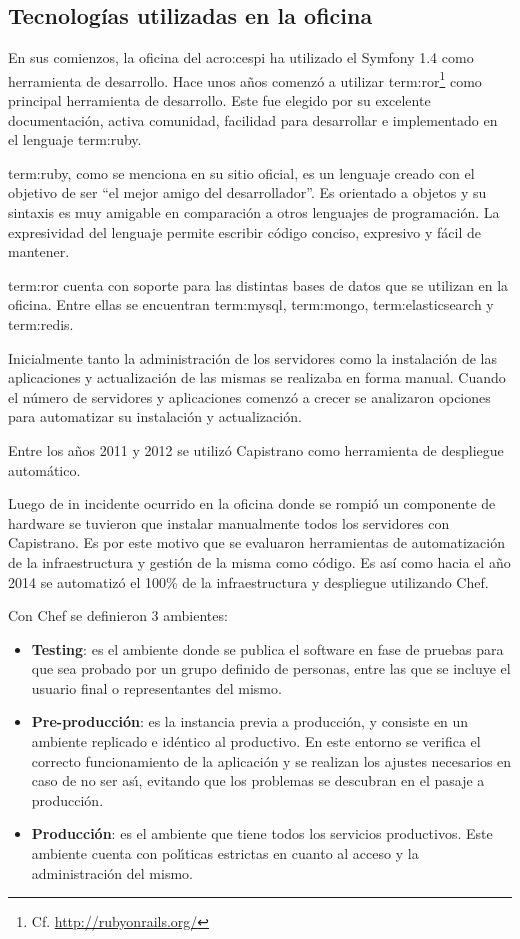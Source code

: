 \subsection{Tecnologías utilizadas en la oficina}
\label{tecnologias_utilizadas}

En sus comienzos, la oficina del \gls{acro:cespi} ha utilizado el
  Symfony 1.4 como herramienta de desarrollo. Hace unos
años comenzó a utilizar \gls{term:ror}\footnote{Cf.
\url{http://rubyonrails.org/}} como principal herramienta de desarrollo. Este
 fue elegido por su excelente documentación, activa comunidad,
facilidad para desarrollar e implementado en el lenguaje \gls{term:ruby}.

\gls{term:ruby}, como se menciona en su sitio oficial, es un lenguaje creado
con el objetivo de ser “el mejor amigo del desarrollador”. Es orientado a
objetos y su sintaxis es muy amigable en comparación a otros lenguajes de
programación. La expresividad del lenguaje permite escribir código conciso,
expresivo y fácil de mantener.

\gls{term:ror} cuenta con soporte para las distintas bases de datos que se
utilizan en la oficina. Entre ellas se encuentran \gls{term:mysql},
\gls{term:mongo}, \gls{term:elasticsearch} y \gls{term:redis}.

Inicialmente tanto la administración de los servidores como la instalación de
las aplicaciones y actualización de las mismas se realizaba en forma manual.
Cuando el número de servidores y aplicaciones comenzó a crecer se analizaron
opciones para automatizar su instalación y actualización.

Entre los años 2011 y 2012 se utilizó Capistrano como herramienta de despliegue
automático.

Luego de in incidente ocurrido en la oficina donde se rompió un componente de
hardware se tuvieron que instalar manualmente todos los servidores con
Capistrano.  Es por este motivo que se evaluaron herramientas de automatización
de la infraestructura y gestión de la misma como código. Es así como hacia el
año 2014 se automatizó el 100\% de la infraestructura y despliegue utilizando
Chef.

Con Chef se definieron 3 ambientes:

\begin{itemize}
  \item \textbf{Testing}: es el ambiente donde se publica el software en fase
    de pruebas para que sea probado por un grupo definido de personas, entre
    las que se incluye el usuario final o representantes del mismo.
  \item \textbf{Pre-producción}: es la instancia previa a producción, y
    consiste en un ambiente replicado e idéntico al productivo. En este entorno
    se verifica el correcto funcionamiento de la aplicación y se realizan los
    ajustes necesarios en caso de no ser ası́, evitando que los problemas se
    descubran en el pasaje a producción.
  \item \textbf{Producción}: es el ambiente que tiene todos los servicios
    productivos. Este ambiente cuenta con polı́ticas estrictas en cuanto al
    acceso y la administración del mismo.
\end{itemize}

